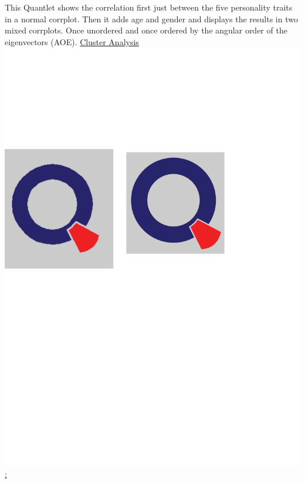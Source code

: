 \newline
This Quantlet shows the correlation first just between the five personality traits in a normal corrplot. Then it adds age and gender and displays the results in two mixed corrplots. Once unordered and once ordered by the angular order of the eigenvectors (AOE).
\newline
\underline{Cluster Analysis \href{https://github.com/Matthias2193/SPL/blob/master/SPL_Big5ClusterAnalysis/SPL_Big5ClusterAnalysis.R}{\includegraphics[scale = 0.06]{Figures/qletlogo.pdf}} :} 
\newline
